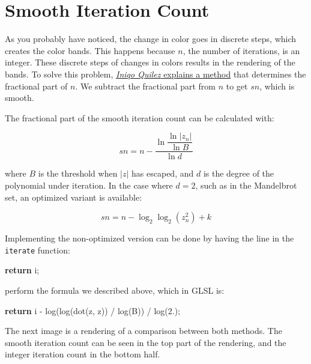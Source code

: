 \documentclass[11pt]{article}
\newenvironment{Shaded}{}{}
\newcommand{\KeywordTok}[1]{\textcolor[rgb]{0.00,0.44,0.13}{\textbf{{#1}}}}
\newcommand{\FloatTok}[1]{\textcolor[rgb]{0.25,0.63,0.44}{{#1}}}
\newcommand{\NormalTok}[1]{{#1}}
\newcommand{\BuiltInTok}[1]{{#1}}
\begin{document}
    \hypertarget{smooth-iteration-count}{%
\section{Smooth Iteration Count}\label{smooth-iteration-count}}

    As you probably have noticed, the change in color goes in discrete
steps, which creates the color bands. This happens because \(n\), the
number of iterations, is an integer. These discrete steps of changes in
colors results in the rendering of the bands. To solve this problem,
\href{https://iquilezles.org/www/articles/mset_smooth/mset_smooth.htm}{\emph{Iniqo
Quilez} explains a method} that determines the fractional part of \(n\).
We subtract the fractional part from \(n\) to get \(sn\), which is
smooth.

    The fractional part of the smooth iteration count can be calculated
with:

    \[ sn = n - \dfrac{\ln \dfrac{\ln |z_n|}{\ln B}}{\ln d} \]

    where \(B\) is the threshold when \(|z|\) has escaped, and \(d\) is the
degree of the polynomial under iteration. In the case where \(d=2\),
such as in the Mandelbrot set, an optimized variant is available:

    \[ sn = n - \log_2\log_2(z_n^2)+k \]

Implementing the non-optimized version can be done by having the line in
the \texttt{iterate} function:

\begin{Shaded}
\begin{Highlighting}[]
\KeywordTok{return}\NormalTok{ i;}
\end{Highlighting}
\end{Shaded}

perform the formula we described above, which in GLSL is:

\begin{Shaded}
\begin{Highlighting}[]
\KeywordTok{return}\NormalTok{ i - }\BuiltInTok{log}\NormalTok{(}\BuiltInTok{log}\NormalTok{(}\BuiltInTok{dot}\NormalTok{(z, z)) / }\BuiltInTok{log}\NormalTok{(B)) / }\BuiltInTok{log}\NormalTok{(}\FloatTok{2.}\NormalTok{);  }
\end{Highlighting}
\end{Shaded}

    The next image is a rendering of a comparison between both methods. The
smooth iteration count can be seen in the top part of the rendering, and
the integer iteration count in the bottom half.
\end{document}
